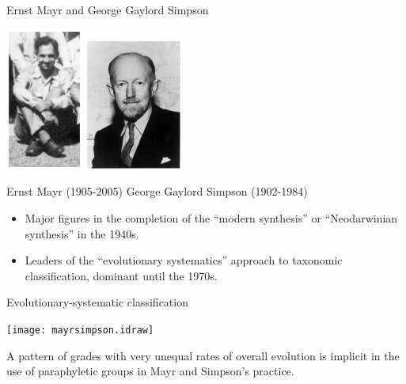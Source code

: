 \documentclass[pdf,bluish,slideColor,colorBG]{prosper}
\begin{document}
\begin{slide}[Replace]{Ernst Mayr and George Gaylord Simpson}

\centerline{\includegraphics[width=1.0in]{mayr1953.ps} \hspace{0.4in}
\includegraphics[width=1.25in]{simpson.ps}}
\bigskip

\centerline{\hspace*{0in}\hspace{0.2in}Ernst Mayr (1905-2005) \hspace{0.2in} George Gaylord Simpson (1902-1984)}
\medskip

\begin{itemize}
\item Major figures in the completion of the ``modern synthesis'' or ``Neodarwinian
synthesis'' in the 1940s.
\item Leaders of the ``evolutionary systematics''
approach to taxonomic classification, dominant until the 1970s.
\end{itemize}

\end{slide}

\begin{slide}[Replace]{Evolutionary-systematic classification}
\bigskip

\centerline{\texttt{[image: mayrsimpson.idraw]}}
\bigskip


A pattern of grades with very unequal rates of overall evolution is implicit
in the use of paraphyletic groups in Mayr and Simpson's practice.

\end{slide}
\end{document}
